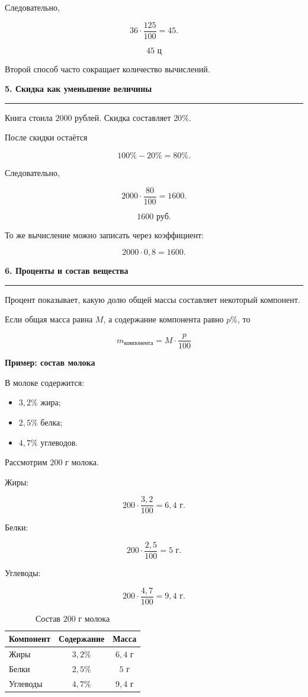 \documentclass[a4paper,12pt]{article}
\newcommand{\sectiontitle}[1]{%
    \vspace{0.6em}
    {\Large\bfseries\color{darkaccent}#1\par}
    \vspace{0.15em}
    {\color{accent}\rule{\linewidth}{0.6pt}}
    \vspace{0.4em}
}
\newcommand{\subsectiontitle}[1]{%
    \vspace{0.35em}
    {\large\bfseries\color{accent}#1\par}
    \vspace{0.15em}
}
\begin{document}
Следовательно,

\[
36\cdot\frac{125}{100}=45.
\]

\[
\boxed{45\text{ ц}}
\]

Второй способ часто сокращает количество вычислений.

\sectiontitle{5. Скидка как уменьшение величины}

Книга стоила \(2000\) рублей. Скидка составляет \(20\%\).

После скидки остаётся

\[
100\%-20\%=80\%.
\]

Следовательно,

\[
2000\cdot\frac{80}{100}=1600.
\]

\[
\boxed{1600\text{ руб.}}
\]

То же вычисление можно записать через коэффициент:

\[
2000\cdot0{,}8=1600.
\]

\sectiontitle{6. Проценты и состав вещества}

Процент показывает, какую долю общей массы составляет некоторый компонент.

Если общая масса равна \(M\), а содержание компонента равно \(p\%\), то

\[
\boxed{
m_{\text{компонента}}
=
M\cdot\frac{p}{100}
}
\]

\subsectiontitle{Пример: состав молока}

В молоке содержится:

\begin{itemize}
    \item \(3{,}2\%\) жира;
    \item \(2{,}5\%\) белка;
    \item \(4{,}7\%\) углеводов.
\end{itemize}

Рассмотрим \(200\) г молока.

Жиры:

\[
200\cdot\frac{3{,}2}{100}=6{,}4\text{ г}.
\]

Белки:

\[
200\cdot\frac{2{,}5}{100}=5\text{ г}.
\]

Углеводы:

\[
200\cdot\frac{4{,}7}{100}=9{,}4\text{ г}.
\]

\begin{table}[h]
\centering
\caption{Состав \(200\) г молока}
\renewcommand{\arraystretch}{1.3}
\begin{tabularx}{0.76\linewidth}{Xcc}
\toprule
Компонент & Содержание & Масса \\
\midrule
Жиры & \(3{,}2\%\) & \(6{,}4\) г \\
Белки & \(2{,}5\%\) & \(5\) г \\
Углеводы & \(4{,}7\%\) & \(9{,}4\) г \\
\bottomrule
\end{tabularx}
\end{table}
\end{document}
